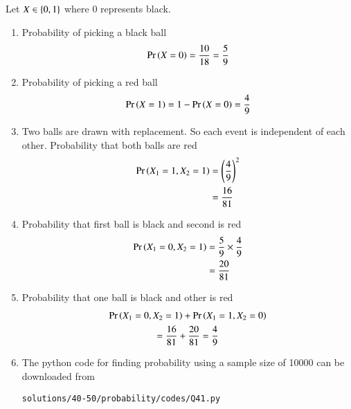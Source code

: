 Let $X \in \left\{0,1\right\}$ where 0 represents black.

\begin{enumerate}
\item Probability of picking a black ball 
\begin{align}
\Pr\left(X=0\right)= \frac{10}{18} = \frac{5}{9}
\end{align}
\item Probability of picking a red ball 
\begin{align}
\Pr\left(X=1\right) = 1-\Pr\left(X=0\right)=  \frac{4}{9}
\end{align}
\item Two balls are drawn with replacement. So each event is independent of each other. 
 Probability that both balls are red 
\begin{align}
\Pr\left(X_1 = 1, X_2 = 1\right) &= \left(\frac{4}{9}\right)^2
\\
&=\frac{16}{81}
\end{align}
\item Probability that first ball is black and second is red
\begin{align}
\Pr\left(X_1 = 0, X_2 = 1\right)&= \frac{5}{9}\times\frac{4}{9}\\
&= \frac{20}{81}
\end{align}
\item Probability that one ball is black and other is red 
\begin{multline}
\Pr\left(X_1 = 0, X_2 = 1\right)+\Pr\left(X_1 = 1, X_2 = 0\right)
\\
= \frac{16}{81}+\frac{20}{81}= \frac{4}{9}
\end{multline}
\item The python code for finding probability using a sample size of 10000 can be downloaded from
\begin{lstlisting}
solutions/40-50/probability/codes/Q41.py
\end{lstlisting}
\end{enumerate}
